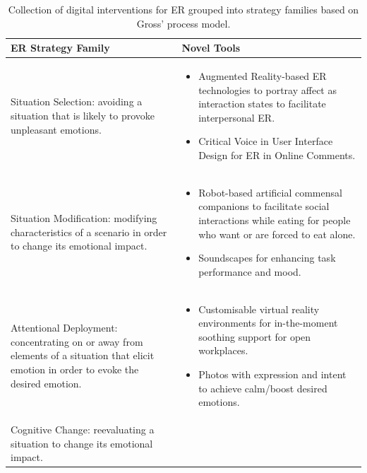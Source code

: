 \documentclass[lettersize,journal]{IEEEtran}
\begin{document}
\begin{table}[]
\centering
\caption{Collection of digital interventions for ER grouped into strategy families based on Gross' process model.}
\label{tab:my-table}
\begin{tabular}{m{2.7cm}m{5cm}}
\textbf{ER Strategy Family}                                                                                                             & \textbf{Novel Tools}                                                                                                                                                                                                                                                       \\ \hline
Situation Selection: avoiding a situation that is likely to provoke unpleasant emotions.                                                 & \begin{itemize}
\item Augmented Reality-based ER technologies to portray affect as interaction states to facilitate interpersonal ER.
\item Critical Voice in User Interface Design for ER in Online Comments.
\end{itemize}                             \\ \hline
Situation Modification: modifying characteristics of a scenario in order to change its emotional impact.                                 & \begin{itemize}
\item Robot-based artificial commensal companions to facilitate social interactions while eating for people who want or are forced to eat alone. 
\item Soundscapes for enhancing task performance and mood.
\end{itemize}                 \\ \hline
Attentional Deployment: concentrating on or away from elements of a situation that elicit emotion in order to evoke the desired emotion. & \begin{itemize}
\item Customisable virtual reality environments for in-the-moment soothing support for open workplaces.
\item Photos with expression and intent to achieve calm/boost desired emotions.
\end{itemize}                                       \\ \hline
Cognitive Change: reevaluating a situation to change its emotional impact.                                                               & \begin{itemize}

\end{itemize}
\end{tabular}
\end{table}
\end{document}
